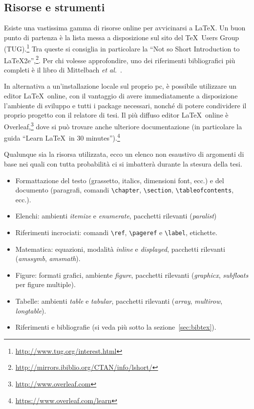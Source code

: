 \documentclass[12pt]{report}
\begin{document}
    \subsection{Risorse e strumenti}

    Esiste una vastissima gamma di risorse online per avvicinarsi a \LaTeX. Un buon punto di partenza \`e la lista messa a disposizione sul sito del \TeX\ Users Group (TUG).\footnote{\url{http://www.tug.org/interest.html}}
    Tra queste si consiglia in particolare la ``Not so Short Introduction to LaTeX2e'',\footnote{\url{http://mirrors.ibiblio.org/CTAN/info/lshort/}}. Per chi volesse approfondire, uno dei riferimenti bibliografici pi\`u completi \`e il libro di Mittelbach {\em et al.}~\cite{mittelbach2004latex}.

    In alternativa a un'installazione locale sul proprio pc, \`e possibile utilizzare un editor \LaTeX\ online, con il vantaggio di avere immediatamente a disposizione l'ambiente di sviluppo e tutti i package necessari, nonch\'e di potere condividere il proprio progetto con il relatore di tesi. Il pi\`u diffuso editor \LaTeX\ online \`e Overleaf,\footnote{\url{http://www.overleaf.com}} dove si pu\`o trovare anche ulteriore documentazione (in particolare la guida ``Learn \LaTeX\ in 30 minutes'').\footnote{\url{https://www.overleaf.com/learn}}

    Qualunque sia la risorsa utilizzata, ecco un elenco non esaustivo di argomenti di base nei quali con tutta probabilit\`a ci si imbatter\`a durante la stesura della tesi.
    \begin{itemize}
        \item Formattazione del testo (grassetto, italics, dimensioni font, ecc.) e del documento (paragrafi, comandi \verb|\chapter|, \verb|\section|, \verb|\tableofcontents|, ecc.).
        \item Elenchi: ambienti {\em itemize} e {\em enumerate}, pacchetti rilevanti ({\em paralist})
        \item Riferimenti incrociati: comandi \verb|\ref|, \verb|\pageref| e \verb|\label|, etichette.
        \item Matematica: equazioni, modalit\`a {\em inline} e {\em displayed}, pacchetti rilevanti ({\em amssymb}, {\em amsmath}).
        \item Figure: formati grafici, ambiente {\em figure}, pacchetti rilevanti ({\em graphicx}, {\em subfloats} per figure multiple).
        \item Tabelle: ambienti {\em table} e {\em tabular}, pacchetti rilevanti ({\em array}, {\em multirow}, {\em longtable}).
        \item Riferimenti e bibliografie (si veda pi\`u sotto la sezione~\ref{sec:bibtex}).
    \end{itemize}
\end{document}
